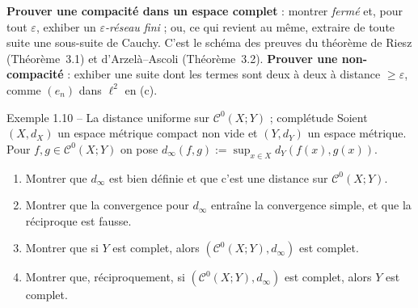 \documentclass[11pt,a4paper]{article}
\newcommand{\Cz}{\mathcal{C}^0}
\theoremstyle{definition}
\begin{document}
\begin{methode}
\textbf{Prouver une compacité dans un espace complet} : montrer \emph{fermé} et, pour tout $\varepsilon$, exhiber un \emph{$\varepsilon$-réseau fini} ; ou, ce qui revient au même, extraire de toute suite une sous-suite de Cauchy. C'est le schéma des preuves du théorème de Riesz (Théorème~3.1) et d'Arzelà--Ascoli (Théorème~3.2). \textbf{Prouver une non-compacité} : exhiber une suite dont les termes sont deux à deux à distance $\ge\varepsilon$, comme $(e_n)$ dans $\ell^2$ en (c).
\end{methode}

\begin{exo}{Exemple 1.10 -- La distance uniforme sur $\Cz(X;Y)$ ; complétude}
Soient $(X,d_X)$ un espace métrique compact non vide et $(Y,d_Y)$ un espace métrique. Pour $f,g\in\Cz(X;Y)$ on pose $d_\infty(f,g):=\sup_{x\in X}d_Y(f(x),g(x))$.
\begin{enumerate}[label=(\alph*)]
  \item Montrer que $d_\infty$ est bien définie et que c'est une distance sur $\Cz(X;Y)$.
  \item Montrer que la convergence pour $d_\infty$ entraîne la convergence simple, et que la réciproque est fausse.
  \item Montrer que si $Y$ est complet, alors $(\Cz(X;Y),d_\infty)$ est complet.
  \item Montrer que, réciproquement, si $(\Cz(X;Y),d_\infty)$ est complet, alors $Y$ est complet.
\end{enumerate}
\end{exo}
\end{document}
